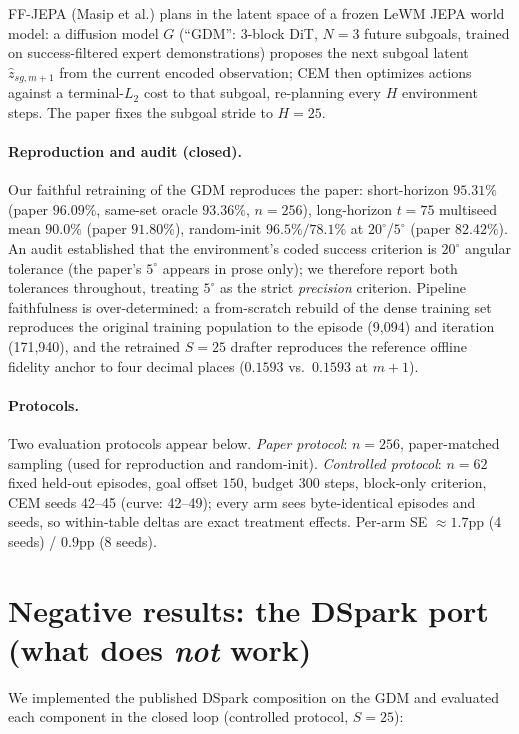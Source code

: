 \documentclass[11pt]{article}
\newcommand{\degc}[1]{$#1^\circ$}
\begin{document}
FF-JEPA (Masip et al.) plans in the latent space of a frozen LeWM JEPA world model:
a diffusion model $G$ (``GDM'': 3-block DiT, $N{=}3$ future subgoals, trained on
success-filtered expert demonstrations) proposes the next subgoal latent
$\hat z_{sg,m+1}$ from the current encoded observation; CEM then optimizes actions
against a terminal-$L_2$ cost to that subgoal, re-planning every $H$ environment
steps. The paper fixes the subgoal stride to $H{=}25$.

\paragraph{Reproduction and audit (closed).} Our faithful retraining of the GDM
reproduces the paper: short-horizon $95.31\%$ (paper $96.09\%$, same-set oracle
$93.36\%$, $n{=}256$), long-horizon $t{=}75$ multiseed mean $90.0\%$ (paper
$91.80\%$), random-init $96.5\%/78.1\%$ at \degc{20}/\degc{5} (paper $82.42\%$).
An audit established that the environment's coded success criterion is
\degc{20} angular tolerance (the paper's \degc{5} appears in prose only); we
therefore report both tolerances throughout, treating \degc{5} as the strict
\emph{precision} criterion. Pipeline faithfulness is over-determined: a from-scratch
rebuild of the dense training set reproduces the original training population to the
episode (9{,}094) and iteration (171{,}940), and the retrained $S{=}25$ drafter
reproduces the reference offline fidelity anchor to four decimal places
($0.1593$ vs.\ $0.1593$ at $m{+}1$).

\paragraph{Protocols.} Two evaluation protocols appear below. \emph{Paper protocol}:
$n{=}256$, paper-matched sampling (used for reproduction and random-init).
\emph{Controlled protocol}: $n{=}62$ fixed held-out episodes, goal offset $150$,
budget $300$ steps, block-only criterion, CEM seeds 42--45 (curve: 42--49); every
arm sees byte-identical episodes and seeds, so within-table deltas are exact
treatment effects. Per-arm SE $\approx 1.7$pp (4 seeds) / $0.9$pp (8 seeds).

\section{Negative results: the DSpark port (what does \emph{not} work)}

We implemented the published DSpark composition on the GDM and evaluated each
component in the closed loop (controlled protocol, $S{=}25$):
\end{document}

